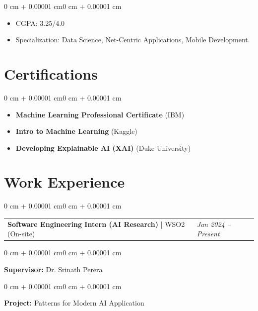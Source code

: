 \documentclass[10pt, letterpaper]{article}
\makeatletter
\newenvironment{highlights}{
    \begin{itemize}[
        topsep=0.10 cm,
        parsep=0.10 cm,
        partopsep=0pt,
        itemsep=0pt,
        leftmargin=0 cm + 10pt
    ]
}{
    \end{itemize}
}
\newenvironment{onecolentry}{
    \begin{adjustwidth}{0 cm + 0.00001 cm}{0 cm + 0.00001 cm}
}{
    \end{adjustwidth}
}
\newenvironment{twocolentry}{
    \begin{onecolentry}
    \begin{tabular}{@{}p{\dimexpr\textwidth-4.5cm\relax}>{\raggedleft\arraybackslash}p{4.5cm}@{}}
}{
    \end{tabular}
    \end{onecolentry}
}
\newcommand{\twocolitem}[2]{#1 & \textit{#2} \\}
\makeatother
\begin{document}
\vspace{0.08 cm}
\begin{onecolentry}
    \begin{highlights}
        \item CGPA: 3.25/4.0
        \item Specialization: Data Science, Net-Centric Applications, Mobile Development.
    \end{highlights}
\end{onecolentry}

\section{Certifications}
\begin{onecolentry}
    \begin{highlights}
        \item \textbf{Machine Learning Professional Certificate} (IBM)
        \item \textbf{Intro to Machine Learning} (Kaggle)
        \item \textbf{Developing Explainable AI (XAI)} (Duke University)
    \end{highlights}
\end{onecolentry}

\section{Work Experience}

\begin{twocolentry}
\twocolitem{\textbf{Software Engineering Intern (AI Research)} | WSO2 (On-site)}{Jan 2024 -- Present}
\end{twocolentry}

\vspace{0.06 cm}
\begin{onecolentry}
    \textbf{Supervisor:} Dr. Srinath Perera
\end{onecolentry}

\vspace{0.04 cm}
\begin{onecolentry}
    \textbf{Project:} Patterns for Modern AI Application
\end{onecolentry}
\end{document}
